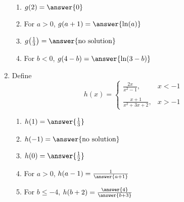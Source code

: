 \documentclass{ximera}
\begin{document}
\begin{exercise}
\begin{enumerate}
\begin{enumerate}
\item $g(2) = \answer{0}$

\item For $a>0$, $g(a+1) = \answer{\ln(a)}$

\item $g\!\left(\frac{1}{3}\right) = \answer{\text{no solution}}$


\item For $b<0$, $g(4-b) = \answer{\ln(3-b)}$

\end{enumerate}

\item Define \begin{equation*}
	h(x) = \begin{cases}
		\frac{2x}{x^2-1},  & x < -1 \\
		\\
		\frac{x+1}{x^2+3x+2},  & x> -1 
		\end{cases}
		\end{equation*}
	\begin{enumerate}
	\item $h(1) = \answer{\frac{1}{3}}$
	
	\item $h(-1) = \answer{\text{no solution}}$
	
	\item $h(0) = \answer{\frac{1}{2}}$
	
	\item For $a>0$, $h(a-1) = \frac{1}{\answer{a+1}}$
	
	\item For $b \leq -4$, $h(b+2) =\frac{\answer{4}}{\answer{b+3}}$
	\end{enumerate}
\end{enumerate}

\end{exercise}
\end{document}
